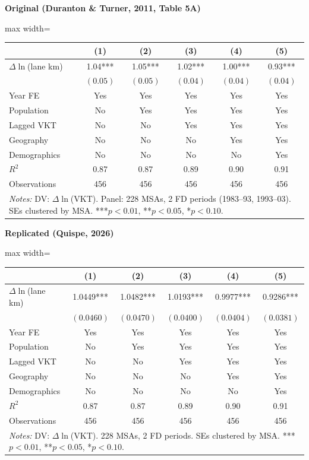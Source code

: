 \documentclass[11pt,a4paper]{article}
\begin{document}
\vspace{0.5cm}
\begin{minipage}[t]{0.48\textwidth}
\centering
\textbf{\large Original (Duranton \& Turner, 2011, Table 5A)}
\vspace{0.3cm}

\begin{adjustbox}{max width=\textwidth}
\begin{tabular}{lccccc}
\toprule
 & (1) & (2) & (3) & (4) & (5) \\
\midrule
$\Delta\ln$(lane km) & 1.04*** & 1.05*** & 1.02*** & 1.00*** & 0.93*** \\
 & $(0.05)$ & $(0.05)$ & $(0.04)$ & $(0.04)$ & $(0.04)$ \\[0.3em]
\midrule
Year FE & Yes & Yes & Yes & Yes & Yes \\
Population & No & Yes & Yes & Yes & Yes \\
Lagged VKT & No & No & Yes & Yes & Yes \\
Geography & No & No & No & Yes & Yes \\
Demographics & No & No & No & No & Yes \\
$R^2$ & 0.87 & 0.87 & 0.89 & 0.90 & 0.91 \\
Observations & 456 & 456 & 456 & 456 & 456 \\
\bottomrule
\multicolumn{6}{p{0.95\textwidth}}{\footnotesize\textit{Notes:} DV: $\Delta\ln$(VKT). Panel: 228 MSAs, 2 FD periods (1983--93, 1993--03). SEs clustered by MSA. ***$p<0.01$, **$p<0.05$, *$p<0.10$.}
\end{tabular}
\end{adjustbox}
\end{minipage}%
\hfill
\begin{minipage}[t]{0.48\textwidth}
\centering
\textbf{\large Replicated (Quispe, 2026)}
\vspace{0.3cm}

\begin{adjustbox}{max width=\textwidth}
\begin{tabular}{lccccc}
\toprule
 & (1) & (2) & (3) & (4) & (5) \\
\midrule
$\Delta\ln$(lane km) & 1.0449*** & 1.0482*** & 1.0193*** & 0.9977*** & 0.9286*** \\
 & $(0.0460)$ & $(0.0470)$ & $(0.0400)$ & $(0.0404)$ & $(0.0381)$ \\[0.3em]
\midrule
Year FE & Yes & Yes & Yes & Yes & Yes \\
Population & No & Yes & Yes & Yes & Yes \\
Lagged VKT & No & No & Yes & Yes & Yes \\
Geography & No & No & No & Yes & Yes \\
Demographics & No & No & No & No & Yes \\
$R^2$ & 0.87 & 0.87 & 0.89 & 0.90 & 0.91 \\
Observations & 456 & 456 & 456 & 456 & 456 \\
\bottomrule
\multicolumn{6}{p{0.95\textwidth}}{\footnotesize\textit{Notes:} DV: $\Delta\ln$(VKT). 228 MSAs, 2 FD periods. SEs clustered by MSA. ***$p<0.01$, **$p<0.05$, *$p<0.10$.}
\end{tabular}
\end{adjustbox}
\end{minipage}
\end{document}
